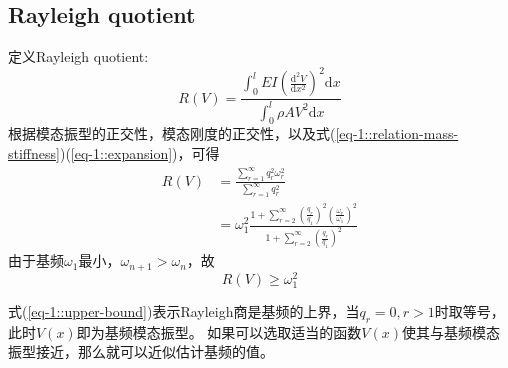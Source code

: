 \subsection{Rayleigh quotient}

定义Rayleigh quotient:
\begin{equation}\label{eq-1::Rayleigh-quotient}
    R(V)=\frac{\int_{0}^{l}EI\left(\frac{\mathrm{d}^{2}V}{\mathrm{d}x^{2}}\right)^{2}\mathrm{d}x}
    {\int_{0}^{l}\rho AV^{2}\mathrm{d}x}
\end{equation}
根据模态振型的正交性，模态刚度的正交性，以及式(\ref{eq-1::relation-mass-stiffness})(\ref{eq-1::expansion})，可得
\begin{equation}
    \begin{aligned}
        R(V)&=\frac{\sum_{r=1}^{\infty}q_{r}^{2}\omega_{r}^{2}}{\sum_{r=1}^{\infty}q_{r}^{2}}\\
        &=\omega_{1}^{2}\frac{1 + \sum_{r=2}^{\infty}\left(\frac{q_{r}}{q_{1}}\right)^{2}
        \left(\frac{\omega_{r}}{\omega_{1}}\right)^{2}}{1 + \sum_{r=2}^{\infty}\left(\frac{q_{r}}{q_{1}}\right)^{2}}
    \end{aligned}
\end{equation}
由于基频$\omega_{1}$最小，$\omega_{n+1}>\omega_{n}$，故
\begin{equation}\label{eq-1::upper-bound}
    R(V)\ge \omega_{1}^{2}
\end{equation}

式(\ref{eq-1::upper-bound})表示Rayleigh商是基频的上界，当$q_{r}=0,r>1$时取等号，此时$V(x)$即为基频模态振型。
如果可以选取适当的函数$V(x)$使其与基频模态振型接近，那么就可以近似估计基频的值。